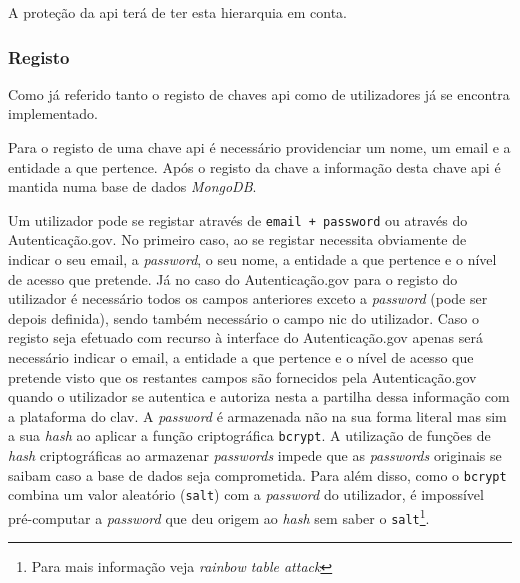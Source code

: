 A proteção da \acrshort{api} terá de ter esta hierarquia em conta.

\subsubsection{Registo}

Como já referido tanto o registo de chaves \acrshort{api} como de utilizadores já se encontra implementado.

Para o registo de uma chave \acrshort{api} é necessário providenciar um nome, um email e a entidade a que pertence. Após o registo da chave a informação desta chave \acrshort{api} é mantida numa base de dados \textit{MongoDB}.

Um utilizador pode se registar através de \texttt{email + password} ou através do Autenticação.gov. No primeiro caso, ao se registar necessita obviamente de indicar o seu email, a \textit{password}, o seu nome, a entidade a que pertence e o nível de acesso que pretende. Já no caso do Autenticação.gov para o registo do utilizador é necessário todos os campos anteriores exceto a \textit{password} (pode ser depois definida), sendo também necessário o campo \acrfull{nic} do utilizador. Caso o registo seja efetuado com recurso à interface do Autenticação.gov apenas será necessário indicar o email, a entidade a que pertence e o nível de acesso que pretende visto que os restantes campos são fornecidos pela Autenticação.gov quando o utilizador se autentica e autoriza nesta a partilha dessa informação com a plataforma do \acrshort{clav}.
A \textit{password} é armazenada não na sua forma literal mas sim a sua \textit{hash} ao aplicar a função criptográfica \texttt{bcrypt}. A utilização de funções de \textit{hash} criptográficas ao armazenar \textit{passwords} impede que as \textit{passwords} originais se saibam caso a base de dados seja comprometida. Para além disso, como o \texttt{bcrypt} combina um valor aleatório (\texttt{salt}) com a \textit{password} do utilizador, é impossível pré-computar a \textit{password} que deu origem ao \textit{hash} sem saber o \texttt{salt}\footnote{Para mais informação veja \textit{rainbow table attack}}.

